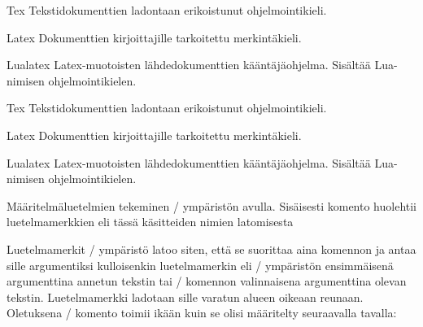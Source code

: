 \begin{esimerkki*}

\begin{koodilohko}
\begin{list}{}{
    \renewcommand{\makelabel}[1]{\textsc{#1:}}
    \setlength{\leftmargin}{1.5em}
    \setlength{\labelwidth}{1.5em}
    \setlength{\itemindent}{1em}
    \setlength{\labelsep}{1em}
    \setlength{\itemsep}{.2ex}
  }
\item[Tex] Tekstidokumenttien ladontaan erikoistunut ohjelmointikieli.
\item[Latex] Dokumenttien kirjoittajille tarkoitettu merkintäkieli.
\item[Lualatex] Latex-muotoisten lähdedokumenttien kääntäjäohjelma.
  Sisältää Lua-nimi\-sen ohjelmointikielen.
\end{list}
\end{koodilohko}
  \begin{tulos}
    \begin{list}{}{
        \renewcommand{\makelabel}[1]{\textsc{#1:}}
        \setlength{\leftmargin}{1.5em}
        \setlength{\labelwidth}{1.5em}
        \setlength{\itemindent}{1em}
        \setlength{\labelsep}{1em}
        \setlength{\itemsep}{.2ex}
      }
    \item[Tex] Tekstidokumenttien ladontaan erikoistunut ohjelmointikieli.
    \item[Latex] Dokumenttien kirjoittajille tarkoitettu merkintäkieli.
    \item[Lualatex] Latex-muotoisten lähdedokumenttien kääntäjäohjelma.
      Sisältää Lua-nimi\-sen ohjelmointikielen.
    \end{list}
  \end{tulos}
  \caption{Määritelmäluetelmien tekeminen \-/ ympäristön
    avulla. Sisäisesti komento  huolehtii
    luetelmamerkkien eli tässä käsitteiden nimien latomisesta}
  \label{esim:list_makelabel}
\end{esimerkki*}

Luetelmamerkit \-/ ympäristö latoo siten, että se
suorittaa aina komennon  ja antaa sille argumentiksi
kulloisenkin luetelmamerkin eli \-/ ympäristön
ensimmäisenä argumenttina annetun tekstin tai \-/ komennon
valinnaisena argumenttina olevan tekstin. Luetelmamerkki ladotaan sille
varatun alueen oikeaan reunaan. Oletuksena \-/
komento toimii ikään kuin se olisi määritelty seuraavalla tavalla:

